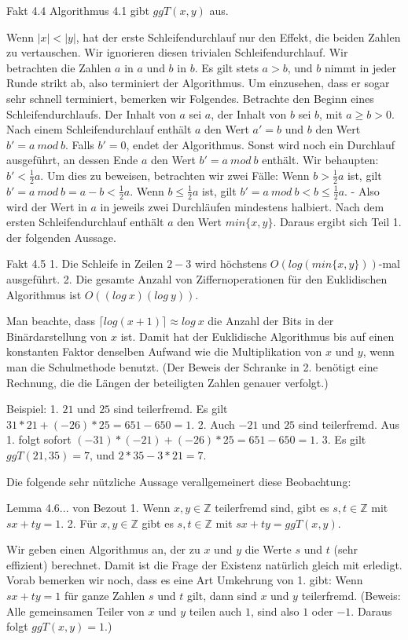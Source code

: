 \documentclass[a4paper]{article}
\begin{document}
\begin{multicols}{3}
Fakt 4.4 Algorithmus 4.1 gibt $ggT(x,y)$ aus.

Wenn $|x|<|y|$, hat der erste Schleifendurchlauf nur den Effekt, die beiden Zahlen zu vertauschen. Wir ignorieren diesen trivialen Schleifendurchlauf. Wir betrachten die Zahlen $a$ in $a$ und $b$ in $b$. Es gilt stets $a>b$, und $b$ nimmt in jeder Runde strikt ab, also terminiert der Algorithmus. Um einzusehen, dass er sogar sehr schnell terminiert, bemerken wir Folgendes. Betrachte den Beginn eines Schleifendurchlaufs. Der Inhalt von $a$ sei $a$, der Inhalt von $b$ sei $b$, mit $a\geq b >0$. Nach einem Schleifendurchlauf enthält $a$ den Wert $a′=b$ und $b$ den Wert $b′=a\ mod\ b$. Falls $b′=0$, endet der Algorithmus. Sonst wird noch ein Durchlauf ausgeführt, an dessen Ende $a$ den Wert $b′=a\ mod\ b$ enthält. Wir behaupten: $b′<\frac{1}{2} a$. Um dies zu beweisen, betrachten wir zwei Fälle: Wenn $b>\frac{1}{2} a$ ist, gilt $b′=a\ mod\ b=a-b<\frac{1}{2} a$. Wenn $b\leq\frac{1}{2} a$ ist, gilt $b′=a\ mod\ b < b\leq\frac{1}{2} a$. - Also wird der Wert in $a$ in jeweils zwei Durchläufen mindestens halbiert. Nach dem ersten Schleifendurchlauf enthält $a$ den Wert $min\{x,y\}$. Daraus ergibt sich Teil 1. der folgenden Aussage.

Fakt 4.5
1. Die Schleife in Zeilen $2-3$ wird höchstens $O(log(min\{x,y\}))$-mal ausgeführt.
2. Die gesamte Anzahl von Ziffernoperationen für den Euklidischen Algorithmus ist $O((log\ x)(log\ y))$.

Man beachte, dass $\lceil log(x+1)\rceil\approx log\ x$ die Anzahl der Bits in der Binärdarstellung von $x$ ist. Damit hat der Euklidische Algorithmus bis auf einen konstanten Faktor denselben Aufwand wie die Multiplikation von $x$ und $y$, wenn man die Schulmethode benutzt. (Der Beweis der Schranke in 2. benötigt eine Rechnung, die die Längen der beteiligten Zahlen genauer verfolgt.)

Beispiel: 
1. $21$ und $25$ sind teilerfremd. Es gilt $31*21 + (-26)*25 = 651-650 = 1$.
2. Auch $-21$ und $25$ sind teilerfremd. Aus 1. folgt sofort $(-31)*(-21) + (-26)*25 =651 -650 = 1$.
3. Es gilt $ggT(21,35) = 7$, und $2* 35 - 3 *21 = 7$.

Die folgende sehr nützliche Aussage verallgemeinert diese Beobachtung:

Lemma 4.6... von Bezout
1. Wenn $x,y\in\mathbb{Z}$ teilerfremd sind, gibt es $s,t\in\mathbb{Z}$ mit $sx+ty= 1$.
2. Für $x,y\in\mathbb{Z}$ gibt es $s,t\in\mathbb{Z}$ mit $sx+ty= ggT(x,y)$.

Wir geben einen Algorithmus an, der zu $x$ und $y$ die Werte $s$ und $t$ (sehr effizient) berechnet. Damit ist die Frage der Existenz natürlich gleich mit erledigt. Vorab bemerken wir noch, dass es eine Art Umkehrung von 1. gibt: Wenn $sx+ty= 1$ für ganze Zahlen $s$ und $t$ gilt, dann sind $x$ und $y$ teilerfremd. (Beweis: Alle gemeinsamen Teiler von $x$ und $y$ teilen auch $1$, sind also $1$ oder $-1$. Daraus folgt $ggT(x,y) = 1$.)


\end{multicols}
\end{document}
